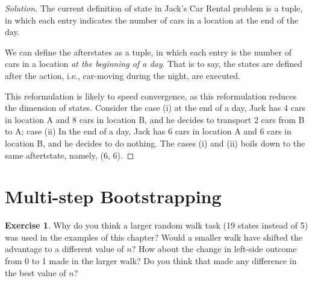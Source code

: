 \documentclass[oneside,11pt]{article}
\theoremstyle{definition}
\newtheorem{exer}[thm]{Exercise}
\newenvironment{solution}
{\renewcommand\qedsymbol{$\blacksquare$}\begin{proof}[Solution]} {\end{proof}}
\begin{document}
\begin{shaded}
\begin{solution} 
The current definition of state in Jack's Car Rental problem is a tuple, in which each entry indicates the number of cars in a location at the end of the day. 

We can define the afterstates as a tuple, in which each entry is the number of cars in a location \emph{at the beginning of a day}. That is to say, the states are defined after the action, i.e., car-moving during the night, are executed.

This reformulation is likely to speed convergence, as this reformulation reduces the dimension of states. Consider the case (i) at the end of a day, Jack has 4 cars in location A and 8 cars in location B, and he decides to transport 2 cars from B to A; case (ii) In the end of a day, Jack has 6 cars in location A and 6 cars in location B, and he decides to do nothing. The cases (i) and (ii) boils down to the same aftertstate, namely, (6, 6).

\end{solution} 
\end{shaded}


\section{Multi-step Bootstrapping}

\begin{exer}
Why do you think a larger random walk task (19 states instead of 5) was used in the examples of this chapter? Would a smaller walk have shifted the advantage to a different value of $n$? How about the change in left-side outcome from 0 to 1 made in the larger walk? Do you think that made any difference in the best value of $n$?
\end{exer}
\end{document}
